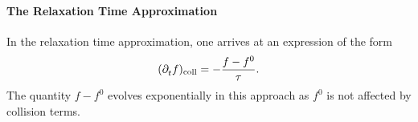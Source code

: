 \paragraph{The Relaxation Time Approximation}
In the relaxation time approximation, one arrives at an expression of the form
\begin{align*}
	(\partial^{}_{t}{f})_{\text{coll}} = -\frac{f - f^{0}}{\tau}.
\end{align*}
The quantity $f - f^{0}$ evolves exponentially in this approach as $f^{0}$ is not affected by collision terms.